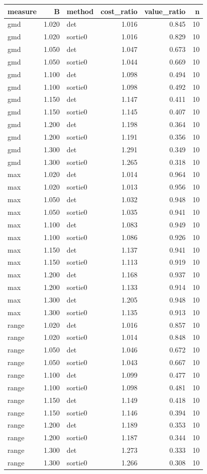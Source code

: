\begin{tabular}{lrlrrr}
\toprule
measure & B & method & cost\_ratio & value\_ratio & n \\
\midrule
gmd & 1.020 & det & 1.016 & 0.845 & 10 \\
gmd & 1.020 & sortie0 & 1.016 & 0.829 & 10 \\
gmd & 1.050 & det & 1.047 & 0.673 & 10 \\
gmd & 1.050 & sortie0 & 1.044 & 0.669 & 10 \\
gmd & 1.100 & det & 1.098 & 0.494 & 10 \\
gmd & 1.100 & sortie0 & 1.098 & 0.492 & 10 \\
gmd & 1.150 & det & 1.147 & 0.411 & 10 \\
gmd & 1.150 & sortie0 & 1.145 & 0.407 & 10 \\
gmd & 1.200 & det & 1.198 & 0.364 & 10 \\
gmd & 1.200 & sortie0 & 1.191 & 0.356 & 10 \\
gmd & 1.300 & det & 1.291 & 0.349 & 10 \\
gmd & 1.300 & sortie0 & 1.265 & 0.318 & 10 \\
max & 1.020 & det & 1.014 & 0.964 & 10 \\
max & 1.020 & sortie0 & 1.013 & 0.956 & 10 \\
max & 1.050 & det & 1.032 & 0.948 & 10 \\
max & 1.050 & sortie0 & 1.035 & 0.941 & 10 \\
max & 1.100 & det & 1.083 & 0.949 & 10 \\
max & 1.100 & sortie0 & 1.086 & 0.926 & 10 \\
max & 1.150 & det & 1.137 & 0.941 & 10 \\
max & 1.150 & sortie0 & 1.113 & 0.919 & 10 \\
max & 1.200 & det & 1.168 & 0.937 & 10 \\
max & 1.200 & sortie0 & 1.133 & 0.914 & 10 \\
max & 1.300 & det & 1.205 & 0.948 & 10 \\
max & 1.300 & sortie0 & 1.135 & 0.913 & 10 \\
range & 1.020 & det & 1.016 & 0.857 & 10 \\
range & 1.020 & sortie0 & 1.014 & 0.848 & 10 \\
range & 1.050 & det & 1.046 & 0.672 & 10 \\
range & 1.050 & sortie0 & 1.043 & 0.667 & 10 \\
range & 1.100 & det & 1.099 & 0.477 & 10 \\
range & 1.100 & sortie0 & 1.098 & 0.481 & 10 \\
range & 1.150 & det & 1.149 & 0.418 & 10 \\
range & 1.150 & sortie0 & 1.146 & 0.394 & 10 \\
range & 1.200 & det & 1.189 & 0.353 & 10 \\
range & 1.200 & sortie0 & 1.187 & 0.344 & 10 \\
range & 1.300 & det & 1.273 & 0.333 & 10 \\
range & 1.300 & sortie0 & 1.266 & 0.308 & 10 \\
\bottomrule
\end{tabular}
